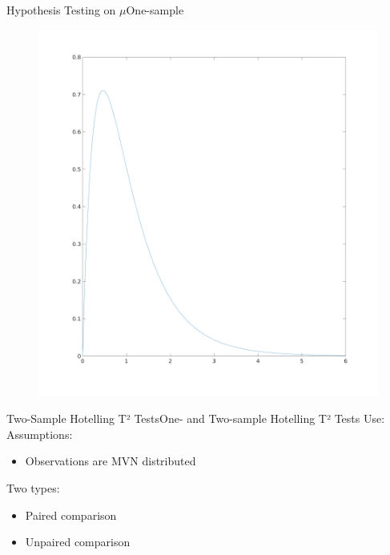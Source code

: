 \documentclass[aspectratio=169,10pt,t]{beamer}
\begin{document}
\begin{frame}{Hypothesis Testing on $\mu$}{One-sample}
	\begin{figure}[H]
		\centering
		\includegraphics[scale=0.15]{images/f.png}
	\end{figure} 
\end{frame}
\begin{frame}{Two-Sample Hotelling T² Tests}{One- and Two-sample Hotelling T² Tests}
    Use: \\
    Assumptions: \\
        \begin{itemize}
            \item Observations are MVN distributed 
        \end{itemize}
    Two types: \\
    \begin{itemize}
        \item Paired comparison 
        \item Unpaired comparison
    \end{itemize}
\end{frame}
\end{document}

